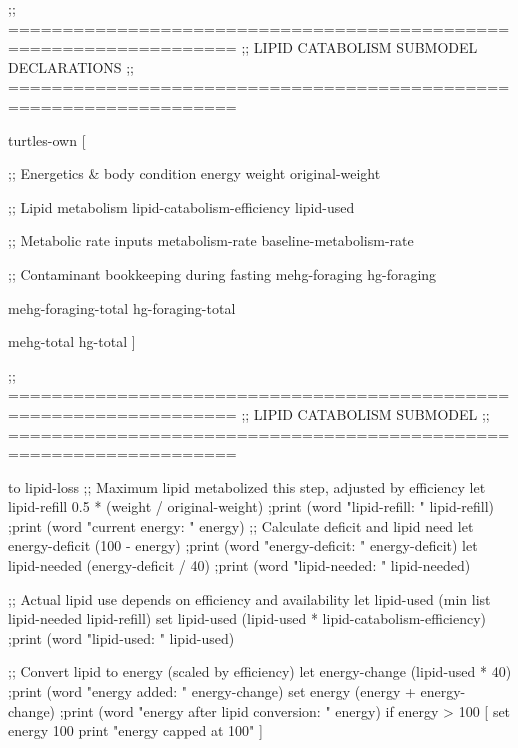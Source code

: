 \documentclass[
]{book}
\newenvironment{Shaded}{\begin{snugshade}}{\end{snugshade}}
\newcommand{\NormalTok}[1]{#1}
\begin{document}
\begin{Shaded}
\begin{Highlighting}[]

\NormalTok{;; ===================================================================}
\NormalTok{;;  LIPID CATABOLISM SUBMODEL DECLARATIONS}
\NormalTok{;; ===================================================================}

\NormalTok{turtles{-}own [}

\NormalTok{  ;; Energetics \& body condition}
\NormalTok{  energy}
\NormalTok{  weight}
\NormalTok{  original{-}weight}

\NormalTok{  ;; Lipid metabolism}
\NormalTok{  lipid{-}catabolism{-}efficiency}
\NormalTok{  lipid{-}used}

\NormalTok{  ;; Metabolic rate inputs}
\NormalTok{  metabolism{-}rate}
\NormalTok{  baseline{-}metabolism{-}rate}

\NormalTok{  ;; Contaminant bookkeeping during fasting}
\NormalTok{  mehg{-}foraging}
\NormalTok{  hg{-}foraging}
  
\NormalTok{  mehg{-}foraging{-}total}
\NormalTok{  hg{-}foraging{-}total}
  
\NormalTok{  mehg{-}total}
\NormalTok{  hg{-}total}
\NormalTok{]}

\NormalTok{;; ===================================================================}
\NormalTok{;;  LIPID CATABOLISM SUBMODEL }
\NormalTok{;; ===================================================================}

\NormalTok{ to lipid{-}loss}
\NormalTok{   ;; Maximum lipid metabolized this step, adjusted by efficiency}
\NormalTok{  let lipid{-}refill 0.5 * (weight / original{-}weight)}
\NormalTok{  ;print (word "lipid{-}refill: " lipid{-}refill)}
\NormalTok{  ;print (word "current energy: " energy)}
\NormalTok{  ;; Calculate deficit and lipid need}
\NormalTok{  let energy{-}deficit (100 {-} energy)}
\NormalTok{  ;print (word "energy{-}deficit: " energy{-}deficit)}
\NormalTok{  let lipid{-}needed (energy{-}deficit / 40)}
\NormalTok{  ;print (word "lipid{-}needed: " lipid{-}needed)}
  
\NormalTok{  ;; Actual lipid use depends on efficiency and availability}
\NormalTok{  let lipid{-}used (min list lipid{-}needed lipid{-}refill)}
\NormalTok{  set lipid{-}used (lipid{-}used * lipid{-}catabolism{-}efficiency)}
\NormalTok{  ;print (word "lipid{-}used: " lipid{-}used)}
  
\NormalTok{  ;; Convert lipid to energy (scaled by efficiency)}
\NormalTok{  let energy{-}change (lipid{-}used * 40)}
\NormalTok{  ;print (word "energy added: " energy{-}change)}
\NormalTok{  set energy (energy + energy{-}change)}
\NormalTok{  ;print (word "energy after lipid conversion: " energy)}
\NormalTok{  if energy \textgreater{} 100 [ }
\NormalTok{    set energy 100 }
\NormalTok{    print "energy capped at 100"}
\NormalTok{  ]}
  

\end{Highlighting}
\end{Shaded}
\end{document}
